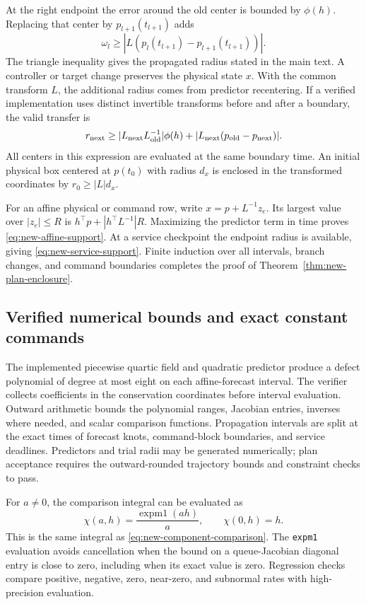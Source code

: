 At the right endpoint the error around the old center is bounded by
$\phi(h)$. Replacing that center by $p_{l+1}(t_{l+1})$ adds
\begin{equation}
 \omega_l\ge
 |L(p_l(t_{l+1})-p_{l+1}(t_{l+1}))|.
 \label{eq:new-recentering-bound}
\end{equation}
The triangle inequality gives the propagated radius stated in the main
text. A controller or target change preserves the physical state $x$.
With the common transform $L$, the additional radius comes from predictor
recentering. If a verified implementation
uses distinct invertible transforms before and after a boundary, the valid
transfer is
\begin{equation}
 r_{\rm next}\ge
 |L_{\rm next}L_{\rm old}^{-1}|\phi(h)
 +|L_{\rm next}(p_{\rm old}-p_{\rm next})|.
 \label{eq:new-coordinate-transfer}
\end{equation}
All centers in this expression are evaluated at the same boundary time.
An initial physical box centered at $p(t_0)$ with radius $d_x$ is enclosed
in the transformed coordinates by $r_0\ge|L|d_x$.

For an affine physical or command row, write
$x=p+L^{-1}z_e$. Its largest value over $|z_e|\le R$ is
$h^\top p+|h^\top L^{-1}|R$. Maximizing the predictor term in time proves
\eqref{eq:new-affine-support}. At a service checkpoint the endpoint radius
is available, giving \eqref{eq:new-service-support}. Finite induction over
all intervals, branch changes, and command boundaries completes the proof
of Theorem~\ref{thm:new-plan-enclosure}.

\subsection{Verified numerical bounds and exact constant commands}

The implemented piecewise quartic field and quadratic predictor produce a
defect polynomial of degree at most eight on each affine-forecast interval.
The verifier collects coefficients in the conservation coordinates before
interval evaluation. Outward arithmetic bounds the polynomial ranges,
Jacobian entries, inverses where needed, and scalar comparison functions.
Propagation intervals are split at the exact times of forecast knots,
command-block boundaries, and service deadlines. Predictors and trial radii
may be generated numerically; plan acceptance requires the outward-rounded
trajectory bounds and constraint checks to pass.

For $a\ne0$, the comparison integral can be evaluated as
\begin{equation}
 \chi(a,h)=\frac{\operatorname{expm1}(ah)}{a},
 \qquad \chi(0,h)=h.
 \label{eq:new-stable-comparison}
\end{equation}
This is the same integral as \eqref{eq:new-component-comparison}.
The \texttt{expm1} evaluation avoids cancellation when the bound on a
queue-Jacobian diagonal entry is close to zero, including when its exact
value is zero. Regression checks compare positive, negative, zero,
near-zero, and subnormal rates with high-precision evaluation.


